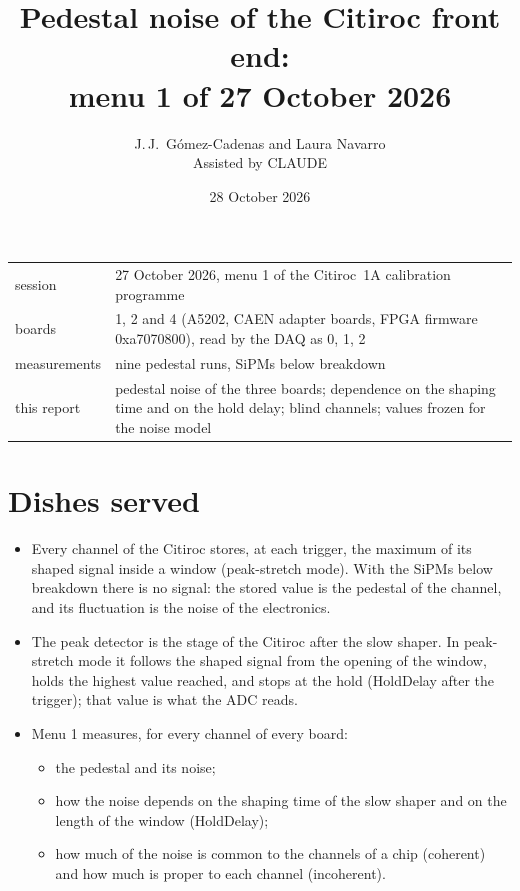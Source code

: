 \documentclass[11pt,a4paper]{article}
\title{Pedestal noise of the Citiroc front end:\\ menu 1 of 27 October 2026}
\author{J.\,J.~Gómez-Cadenas and Laura Navarro\\ \small Assisted by CLAUDE}
\date{28 October 2026}
\begin{document}
\maketitle

\begin{center}
\small
\begin{tabular}{lp{}}
\toprule
session & 27 October 2026, menu 1 of the Citiroc~1A calibration programme \\
boards & 1, 2 and 4 (A5202, CAEN adapter boards, FPGA firmware 0xa7070800), read by the DAQ
  as 0, 1, 2 \\
measurements & nine pedestal runs, SiPMs below breakdown \\
this report & pedestal noise of the three boards; dependence on the shaping time and on the
  hold delay; blind channels; values frozen for the noise model \\
\bottomrule
\end{tabular}
\end{center}

\section{Dishes served}

\begin{itemize}
\item Every channel of the Citiroc stores, at each trigger, the maximum of its shaped signal
  inside a window (peak-stretch mode). With the SiPMs below breakdown there is no signal: the
  stored value is the pedestal of the channel, and its fluctuation is the noise of the
  electronics.
\item The peak detector is the stage of the Citiroc after the slow shaper. In peak-stretch
  mode it follows the shaped signal from the opening of the window, holds the highest value
  reached, and stops at the hold (HoldDelay after the trigger); that value is what the ADC
  reads.
\item Menu 1 measures, for every channel of every board:
  \begin{itemize}
  \item the pedestal and its noise;
  \item how the noise depends on the shaping time of the slow shaper and on the length of
    the window (HoldDelay);
  \item how much of the noise is common to the channels of a chip (coherent) and how much
    is proper to each channel (incoherent).
  \end{itemize}
\end{itemize}
\end{document}
